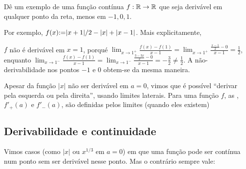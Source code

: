 \begin{exo}
 Dê um exemplo de uma função contínua $f:\mathbb{R}\to \mathbb{R}$ que seja
derivável em qualquer ponto da reta, menos em $-1,0,1$.
\begin{sol}
Por exemplo, $f(x){:=} |x+1|/2-|x|+|x-1|$.
Mais explicitamente,
\begin{center}
\begin{bmlimage}\end{bmlimage}
\end{center}
$f$ não é derivável em $x=1$, porqué 
$\lim_{x\to 1^+}\frac{f(x)-f(1)}{x-1}=\lim_{x\to
1^+}\frac{\frac{x-1}{2}-0}{x-1}=\frac12$,
enquanto 
$\lim_{x\to 1^-}\frac{f(x)-f(1)}{x-1}=\lim_{x\to
1^-}\frac{\frac{3-3x}{2}-0}{x-1}=-\frac32\neq \frac12$.
A não-derivabilidade nos pontos $-1$ e $0$ obtem-se da mesma maneira.
\end{sol}
\end{exo}


Apesar da função $|x|$ não ser derivável em $a=0$, vimos que é possível 
``derivar pela esquerda ou pela direita'', usando limites laterais.
Para uma função $f$, as
, $f'_+(a)$ e $f'_-(a)$,
são definidas pelos limites (quando eles existem)



\subsection{Derivabilidade e continuidade}
Vimos casos (como $|x|$ ou $x^{1/3}$ em $a=0$) em que uma função pode ser
contínua num ponto sem ser derivável nesse ponto. 
Mas o contrário sempre vale:


